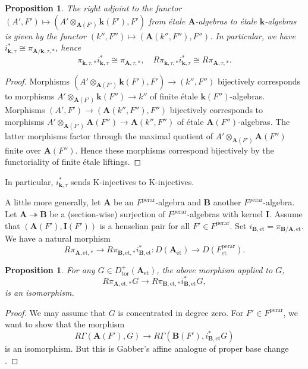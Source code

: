 \documentclass{amsart}
\newtheorem{Prop}[Thm]{Proposition}
\theoremstyle{remark}
\numberwithin{equation}{subsection}
\newcommand{\onto}{\twoheadrightarrow}
\newcommand{\tensor}{\mathbin{\otimes}}
\newcommand{\et}{\mathrm{et}}
\newcommand{\tor}{\mathrm{tor}}
\newcommand{\perar}{\mathrm{perar}}
\newcommand{\alg}[1]{\mathbf{#1}}
\begin{document}
\begin{Prop} \label{0313}
	The right adjoint to the functor $(A', F') \mapsto (A' \tensor_{\alg{A}(F')} \alg{k}(F'), F')$
	from \'etale $\alg{A}$-algebras to \'etale $\alg{k}$-algebras
	is given by the functor $(k'', F'') \mapsto (\alg{A}(k'', F''), F'')$.
	In particular, we have $i_{\alg{k}, \tau}^{\ast} \cong \pi_{\alg{A} / \alg{k}, \tau, \ast}$,
	hence
		\[
					\pi_{\alg{k}, \tau, \ast} i_{\alg{k}, \tau}^{\ast}
				\cong
					\pi_{\alg{A}, \tau, \ast},
			\quad
					R \pi_{\alg{k}, \tau, \ast} i_{\alg{k}, \tau}^{\ast}
				\cong
					R \pi_{\alg{A}, \tau, \ast}.
		\]
\end{Prop}

\begin{proof}
	Morphisms $(A' \tensor_{\alg{A}(F')} \alg{k}(F'), F') \to (k'', F'')$
	bijectively corresponds to morphisms
	$A' \tensor_{\alg{A}(F')} \alg{k}(F'') \to k''$
	of finite \'etale $\alg{k}(F'')$-algebras.
	Morphisms $(A', F') \to (\alg{A}(k'', F''), F'')$
	bijectively corresponds to morphisms
	$A' \tensor_{\alg{A}(F')} \alg{A}(F'') \to \alg{A}(k'', F'')$
	of \'etale $\alg{A}(F'')$-algebras.
	The latter morphisms factor through
	the maximal quotient of $A' \tensor_{\alg{A}(F')} \alg{A}(F'')$
	finite over $\alg{A}(F'')$.
	Hence these morphisms correspond bijectively
	by the functoriality of finite \'etale liftings.
\end{proof}

In particular, $i_{\alg{k}, \tau}^{\ast}$ sends K-injectives to K-injectives.

A little more generally,
let $\alg{A}$ be an $F^{\perar}$-algebra
and $\alg{B}$ another $F^{\perar}$-algebra.
Let $\alg{A} \onto \alg{B}$ be a (section-wise) surjection of $F^{\perar}$-algebras
with kernel $\alg{I}$.
Assume that $(\alg{A}(F'), \alg{I}(F'))$ is a henselian pair for all $F' \in F^{\perar}$.
Set $i_{\alg{B}, \et} = \pi_{\alg{B} / \alg{A}, \et}$.
We have a natural morphism
	\[
			R \pi_{\alg{A}, \et, \ast}
		\to
			R \pi_{\alg{B}, \et, \ast} i_{\alg{B}, \et}^{\ast}
		\colon
			D(\alg{A}_{\et})
		\to
			D(F^{\perar}_{\et}).
	\]

\begin{Prop} \label{0341}
	For any $G \in D_{\tor}^{+}(\alg{A}_{\et})$,
	the above morphism applied to $G$,
		\[
				R \pi_{\alg{A}, \et, \ast} G
			\to
				R \pi_{\alg{B}, \et, \ast} i_{\alg{B}, \et}^{\ast} G,
		\]
	is an isomorphism.
\end{Prop}

\begin{proof}
	We may assume that $G$ is concentrated in degree zero.
	For $F' \in F^{\perar}$, we want to show that the morphism
		\[
				R \Gamma(\alg{A}(F'), G)
			\to
				R \Gamma(\alg{B}(F'), i_{\alg{B}, \et}^{\ast} G)
		\]
	is an isomorphism.
	But this is Gabber's affine analogue of proper base change \cite[Theorem 1]{Gab94}.
\end{proof}
\end{document}
